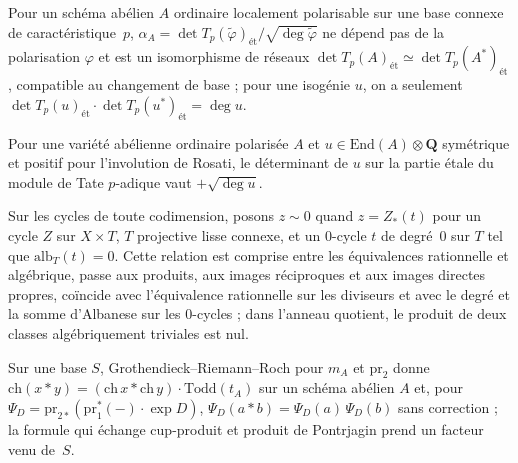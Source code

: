 \begin{encadre}
\begin{theoreme*}\nonverifie
Pour un schéma abélien $A$ ordinaire localement polarisable sur une base connexe de caractéristique~$p$, $\alpha_A = \det T_p(\tilde\varphi)_{\text{ét}}/\sqrt{\deg\tilde\varphi}$ ne dépend pas de la polarisation $\varphi$ et est un isomorphisme de réseaux $\det T_p(A)_{\text{ét}} \simeq \det T_p(A^*)_{\text{ét}}$, compatible au changement de base ; pour une isogénie $u$, on a seulement $\det T_p(u)_{\text{ét}} \cdot \det T_p(u^*)_{\text{ét}} = \deg u$.
\end{theoreme*}
\end{encadre}

\begin{encadre}
\begin{theoreme*}\nonverifie
Pour une variété abélienne ordinaire polarisée $A$ et $u \in \mathrm{End}(A) \otimes \mathbf Q$ symétrique et positif pour l'involution de Rosati, le déterminant de $u$ sur la partie étale du module de Tate $p$-adique vaut $+\sqrt{\deg u}$.
\end{theoreme*}
\end{encadre}

\begin{encadre}
\begin{theoreme*}\nonverifie
Sur les cycles de toute codimension, posons $z \sim 0$ quand $z = Z_*(t)$ pour un cycle $Z$ sur $X \times T$, $T$ projective lisse connexe, et un $0$-cycle $t$ de degré~$0$ sur $T$ tel que $\mathrm{alb}_T(t) = 0$. Cette relation est comprise entre les équivalences rationnelle et algébrique, passe aux produits, aux images réciproques et aux images directes propres, coïncide avec l'équivalence rationnelle sur les diviseurs et avec le degré et la somme d'Albanese sur les $0$-cycles ; dans l'anneau quotient, le produit de deux classes algébriquement triviales est nul.
\end{theoreme*}
\end{encadre}

\begin{encadre}
\begin{theoreme*}\nonverifie
Sur une base $S$, Grothendieck--Riemann--Roch pour $m_A$ et $\mathrm{pr}_2$ donne $\mathrm{ch}(x * y) = (\mathrm{ch}\,x * \mathrm{ch}\,y)\cdot\mathrm{Todd}(t_A)$ sur un schéma abélien $A$ et, pour $\Psi_D = \mathrm{pr}_{2*}(\mathrm{pr}_1^*(-)\cdot\exp D)$, $\Psi_D(a * b) = \Psi_D(a)\,\Psi_D(b)$ sans correction ; la formule qui échange cup-produit et produit de Pontrjagin prend un facteur venu de~$S$.
\end{theoreme*}
\end{encadre}


